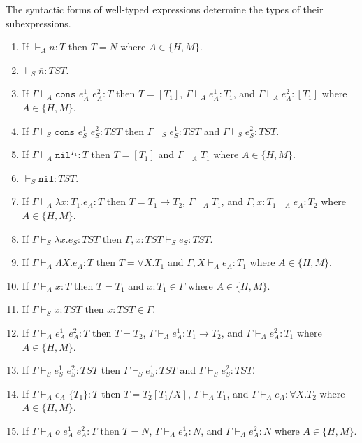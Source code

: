\begin{lemma}
\label{i}
The syntactic forms of well-typed expressions determine the types of their subexpressions.
\begin{enumerate}
\item If $\vdash_{A}\overline{n}:T$ then $T=N$ where $A\in\lbrace H,M\rbrace$.
\item $\vdash_{S}\overline{n}:TST$.
\item If $\Gamma\vdash_{A}\mathtt{cons}$ $e_{A}^{1}$ $e_{A}^{2}:T$ then $T=[T_{1}]$, $\Gamma\vdash_{A}e_{A}^{1}:T_{1}$, and $\Gamma\vdash_{A}e_{A}^{2}:[T_{1}]$ where $A\in\lbrace H,M\rbrace$.
\item If $\Gamma\vdash_{S}\mathtt{cons}$ $e_{S}^{1}$ $e_{S}^{2}:TST$ then $\Gamma\vdash_{S}e_{S}^{1}:TST$ and $\Gamma\vdash_{S}e_{S}^{2}:TST$.
\item If $\Gamma\vdash_{A}\mathtt{nil}^{T_{1}}:T$ then $T=[T_{1}]$ and $\Gamma\vdash_{A}T_{1}$ where $A\in\lbrace H,M\rbrace$.
\item $\vdash_{S}\mathtt{nil}:TST$.
\item If $\Gamma\vdash_{A}\lambda x:T_{1}.e_{A}:T$ then $T=T_{1}\rightarrow T_{2}$, $\Gamma\vdash_{A}T_{1}$, and $\Gamma,x:T_{1}\vdash_{A}e_{A}:T_{2}$ where $A\in\lbrace H,M\rbrace$.
\item If $\Gamma\vdash_{S}\lambda x.e_{S}:TST$ then $\Gamma,x:TST\vdash_{S}e_{S}:TST$.
\item If $\Gamma\vdash_{A}\Lambda X.e_{A}:T$ then $T=\forall X.T_{1}$ and $\Gamma,X\vdash_{A}e_{A}:T_{1}$ where $A\in\lbrace H,M\rbrace$.
\item If $\Gamma\vdash_{A}x:T$ then $T=T_{1}$ and $x:T_{1}\in\Gamma$ where $A\in\lbrace H,M\rbrace$.
\item If $\Gamma\vdash_{S}x:TST$ then $x:TST\in\Gamma$.
\item If $\Gamma\vdash_{A}e_{A}^{1}$ $e_{A}^{2}:T$ then $T=T_{2}$, $\Gamma\vdash_{A}e_{A}^{1}:T_{1}\rightarrow T_{2}$, and $\Gamma\vdash_{A}e_{A}^{2}:T_{1}$ where $A\in\lbrace H,M\rbrace$.
\item If $\Gamma\vdash_{S}e_{S}^{1}$ $e_{S}^{2}:TST$ then $\Gamma\vdash_{S}e_{S}^{1}:TST$ and $\Gamma\vdash_{S}e_{S}^{2}:TST$.
\item If $\Gamma\vdash_{A}e_{A}$ $\lbrace T_{1}\rbrace:T$ then $T=T_{2}[T_{1}/X]$, $\Gamma\vdash_{A}T_{1}$, and $\Gamma\vdash_{A}e_{A}:\forall X.T_{2}$ where $A\in\lbrace H,M\rbrace$.
\item If $\Gamma\vdash_{A}o$ $e_{A}^{1}$ $e_{A}^{2}:T$ then $T=N$, $\Gamma\vdash_{A}e_{A}^{1}:N$, and $\Gamma\vdash_{A}e_{A}^{2}:N$ where $A\in\lbrace H,M\rbrace$.

\end{enumerate}
\end{lemma}

